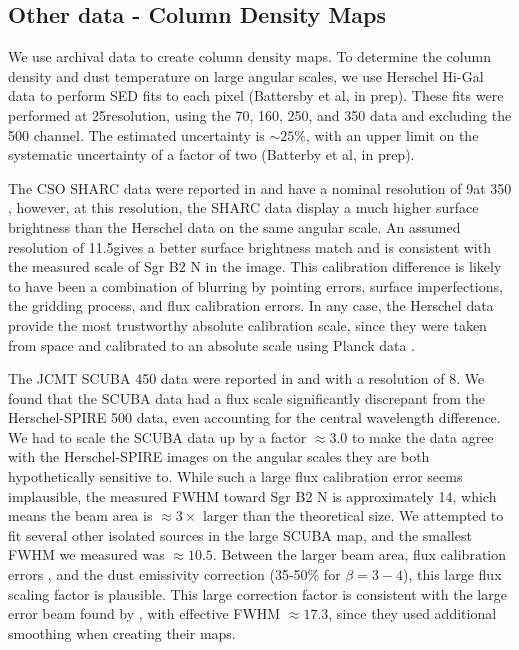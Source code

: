 \documentclass[twocolumn]{aastex61}
\newcommand{\percent}{\%\xspace}
\begin{document}
\subsection{Other data - Column Density Maps}
\label{sec:colmaps}
We use archival data to create column density maps.   To determine the column
density and dust temperature on large angular scales, we use Herschel Hi-Gal
data \citep{Molinari2010a} to perform SED fits to each pixel (Battersby et al,
in prep).  These fits were performed at 25\arcsec resolution, using the 70, 160,
250, and 350 \um data and excluding the 500 \um channel.  The estimated 
uncertainty is $\sim25\%$, with an upper limit on the systematic uncertainty
of a factor of two (Batterby et al, in prep).


The CSO SHARC data were reported in \citet{Bally2010a} and have a nominal
resolution of 9\arcsec at 350 \um, however, at this resolution,
the SHARC data display a much higher surface brightness than the Herschel
data on the same angular scale.  An assumed resolution of 11.5\arcsec gives a
better surface brightness match and is consistent with the measured scale of
Sgr B2 N in the image.  This calibration difference is likely to have been a
combination of blurring by pointing errors, surface imperfections, the
gridding process, and flux calibration errors.  In any case, the Herschel data
provide the most trustworthy absolute calibration scale, since they were taken
from space and calibrated to an absolute scale using Planck data
\citep{Bendo2013a,Bertincourt2015a}.

The JCMT SCUBA 450 \um data were reported in \citet{Pierce-Price2000a} and
\citet{di-Francesco2008a} with a resolution of 8\arcsec.  We found that the
SCUBA data had a flux scale significantly discrepant from the Herschel-SPIRE
500 \um data, even accounting for the central wavelength difference.  We had to
scale the SCUBA data up by a factor $\approx3.0$ to make the data agree with
the Herschel-SPIRE images on the angular scales they are both hypothetically
sensitive to.  While such a large flux calibration error seems implausible, the
measured FWHM toward Sgr B2 N is approximately 14\arcsec, which means the beam
area is $\approx3\times$ larger than the theoretical size.  We attempted to fit
several other isolated sources in the large SCUBA map, and the smallest FWHM we
measured was $\approx10.5$\arcsec.  Between the larger beam area, flux
calibration errors \citep[quoted at 20\percent in][]{Pierce-Price2000a}, and
the dust emissivity correction (35-50\percent for $\beta=3-4$), this large flux
scaling factor is plausible. This large correction factor is consistent with
the large error beam found by \citet{di-Francesco2008a}, with effective FWHM
$\approx17.3$\arcsec, since they used additional smoothing when creating their
maps.
\end{document}
